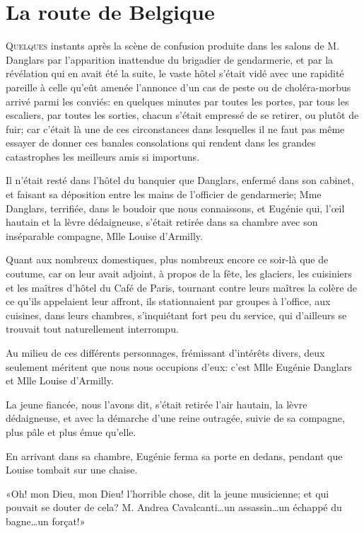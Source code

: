 \chapter{La route de Belgique}

\lettrine{Q}{uelques} instants après la scène de confusion produite dans les salons de M. Danglars par l'apparition inattendue du brigadier de gendarmerie, et par la révélation qui en avait été la suite, le vaste hôtel s'était vidé avec une rapidité pareille à celle qu'eût amenée l'annonce d'un cas de peste ou de choléra-morbus arrivé parmi les conviés: en quelques minutes par toutes les portes, par tous les escaliers, par toutes les sorties, chacun s'était empressé de se retirer, ou plutôt de fuir; car c'était là une de ces circonstances dans lesquelles il ne faut pas même essayer de donner ces banales consolations qui rendent dans les grandes catastrophes les meilleurs amis si importuns. 

Il n'était resté dans l'hôtel du banquier que Danglars, enfermé dans son cabinet, et faisant sa déposition entre les mains de l'officier de gendarmerie; Mme Danglars, terrifiée, dans le boudoir que nous connaissons, et Eugénie qui, l'œil hautain et la lèvre dédaigneuse, s'était retirée dans sa chambre avec son inséparable compagne, Mlle Louise d'Armilly. 

Quant aux nombreux domestiques, plus nombreux encore ce soir-là que de coutume, car on leur avait adjoint, à propos de la fête, les glaciers, les cuisiniers et les maîtres d'hôtel du Café de Paris, tournant contre leurs maîtres la colère de ce qu'ils appelaient leur affront, ils stationnaient par groupes à l'office, aux cuisines, dans leurs chambres, s'inquiétant fort peu du service, qui d'ailleurs se trouvait tout naturellement interrompu. 

Au milieu de ces différents personnages, frémissant d'intérêts divers, deux seulement méritent que nous nous occupions d'eux: c'est Mlle Eugénie Danglars et Mlle Louise d'Armilly. 

La jeune fiancée, nous l'avons dit, s'était retirée l'air hautain, la lèvre dédaigneuse, et avec la démarche d'une reine outragée, suivie de sa compagne, plus pâle et plus émue qu'elle. 

En arrivant dans sa chambre, Eugénie ferma sa porte en dedans, pendant que Louise tombait sur une chaise. 

«Oh! mon Dieu, mon Dieu! l'horrible chose, dit la jeune musicienne; et qui pouvait se douter de cela? M. Andrea Cavalcanti\dots un assassin\dots un échappé du bagne\dots un forçat!» 

